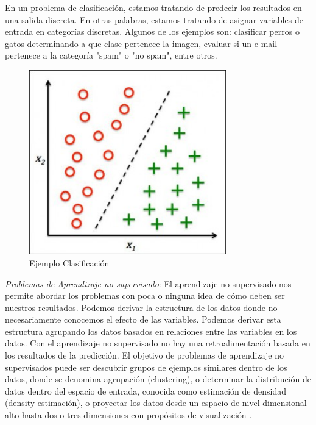 En un problema de clasificación, estamos tratando de predecir los resultados en una salida discreta. En otras palabras, estamos tratando de asignar variables de entrada en categorías discretas. Algunos de los ejemplos son: clasificar perros o gatos determinando a que clase pertenece la imagen, evaluar si un e-mail pertenece a la categoría "spam" o "no spam", entre otros.

\begin{figure}[H] \centering
  \includegraphics[height=8cm,keepaspectratio=true,clip=true]{imagenes/MarcoTeorico/classification.jpg}
  \caption{Ejemplo Clasificación}\label{Fig:clasificacion}
\end{figure}


\item \textit{Problemas de Aprendizaje no supervisado}: El aprendizaje no supervisado nos permite abordar los problemas con
poca o ninguna idea de cómo deben ser nuestros resultados. Podemos derivar la estructura de los datos donde no necesariamente conocemos el efecto de las variables. Podemos derivar esta estructura agrupando los datos basados en relaciones entre las variables en los datos. Con el aprendizaje no supervisado no hay una retroalimentación basada en los resultados de la predicción. El objetivo de problemas de aprendizaje no supervisados puede ser descubrir grupos de ejemplos similares dentro de los datos, donde se denomina agrupación (clustering), o determinar la distribución de datos dentro del espacio de entrada, conocida como estimación de densidad (density estimación), o proyectar los datos desde un espacio de nivel dimensional alto hasta dos o tres dimensiones con propósitos de visualización \citep{bishop}.


